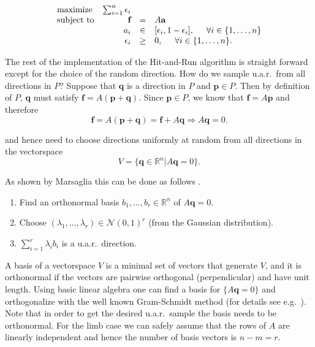 \begin{equation}\label{eq:LP_r}
\begin{array}{lrcl}
\mbox{maximize} & \sum_{i=1}^n \epsilon_i \\ 
\mbox{subject to} & \textbf{f} &=& A\textbf{a}\\
  & a_i &\in& [\epsilon_i, 1- \epsilon_i], \hspace{5mm} \forall i \in \{1,\dots,n\}  \\
  & \epsilon_i &\geq& 0, \hspace{5mm} \forall i \in \{1,\dots,n\}.  
\end{array}
\end{equation}


The rest of the implementation of the Hit-and-Run algorithm is straight forward except for the choice of the random direction. How do we sample u.a.r.\ from all directions in $P$? Suppose that $\textbf{q}$ is a direction in $P$ and $\textbf{p} \in P$. Then by definition of $P$, $\textbf{q}$ must satisfy $\textbf{f} = A(\textbf{p}+\textbf{q})$. Since $\textbf{p} \in P$, we know that $\textbf{f} = A\textbf{p}$ and therefore 
\[\textbf{f} = A(\textbf{p} + \textbf{q}) = \textbf{f} + A\textbf{q} \Rightarrow A\textbf{q} = 0. \]

and hence need to choose directions uniformly at random from all directions in the vectorspace 
\[V = \{\textbf{q} \in \mathbb{R}^n | A\textbf{q} = 0\}.\]

As shown by Marsaglia this can be done as follows \cite{Marsaglia}.

\begin{enumerate}
\item
Find an orthonormal basis $b_1, \dots, b_r \in \mathbb{R}^{n}$ of $A\textbf{q} =0$.
\item
Choose $(\lambda_1, \dots, \lambda_r) \in \mathcal{N}(0,1)^r$ (from the Gaussian distribution).
\item
$\sum_{i=1}^r \lambda_i b_i$ is a u.a.r.\ direction.
\end{enumerate}

A basis of a vectorspace $V$ is a minimal set of vectors that generate $V$, and it is orthonormal if the vectors are pairwise orthogonal (perpendicular) and have unit length. Using basic linear algebra one can find a basis for $\{A\textbf{q} = 0\}$ and orthogonalize with the well known Gram-Schmidt method (for details see e.g.\ \cite{Robertson}). Note that in order to get the desired u.a.r.\ sample the basis needs to be orthonormal. For the limb case we can safely assume that the rows of $A$ are linearly independent and hence the number of basis vectors is $n-m = r$.

